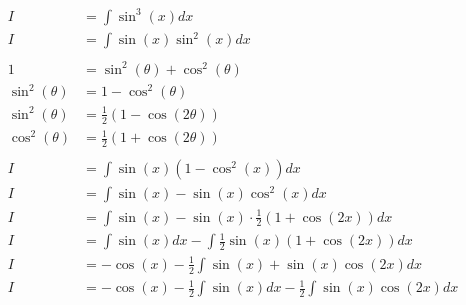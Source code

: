 \documentclass[12pt]{article}
\begin{document}
\begin{align}
    I              & = \int \sin^3(x) dx                                                                                                       \\
    I              & = \int \sin(x)\sin^2(x) dx                                                                                                \\
    \nonumber                                                                                                                                  \\
    1              & = \sin^2(\theta) + \cos^2(\theta)                                                                                         \\
    \sin^2(\theta) & = 1 - \cos^2(\theta)                                                                                                      \\
    \sin^2(\theta) & = \frac{1}{2}(1-\cos(2\theta))                                                                                            \\
    \cos^2(\theta) & = \frac{1}{2}(1+\cos(2\theta))                                                                                            \\
    \nonumber                                                                                                                                  \\
    I              & = \int \sin(x)(1-\cos^2(x)) dx                                                                                            \\
    I              & = \int \sin(x) - \sin(x)\cos^2(x) dx                                                                                      \\
    I              & = \int \sin(x) - \sin(x)\cdot\frac{1}{2}(1+\cos(2x)) dx                                                                   \\
    I              & = \int \sin(x) dx - \int \frac{1}{2}\sin(x)(1+\cos(2x)) dx                                                                \\
    I              & = -\cos(x) - \frac{1}{2} \int \sin(x) + \sin(x)\cos(2x) dx                                                                \\
    I              & = -\cos(x) - \frac{1}{2} \int \sin(x) dx - \frac{1}{2}  \int \sin(x)\cos(2x) dx                                           \\

\end{align}
\end{document}
